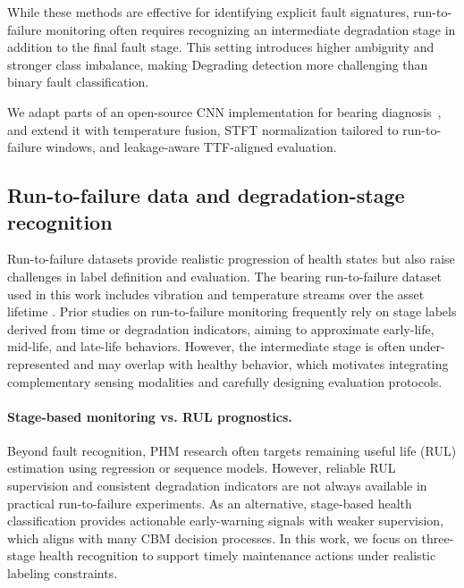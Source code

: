 While these methods are effective for identifying explicit fault signatures, run-to-failure monitoring often requires recognizing an intermediate degradation stage in addition to the final fault stage. This setting introduces higher ambiguity and stronger class imbalance, making Degrading detection more challenging than binary fault classification.

We adapt parts of an open-source CNN implementation for bearing diagnosis~\cite{mdzalfirdausi_paderborn_repo}, and extend it with temperature fusion, STFT normalization tailored to run-to-failure windows, and leakage-aware TTF-aligned evaluation.
\subsection{Run-to-failure data and degradation-stage recognition}
Run-to-failure datasets provide realistic progression of health states but also raise challenges in label definition and evaluation. The bearing run-to-failure dataset used in this work includes vibration and temperature streams over the asset lifetime \cite{jung2024dib_rtf,jung2024mendeley_rtf}. Prior studies on run-to-failure monitoring frequently rely on stage labels derived from time or degradation indicators, aiming to approximate early-life, mid-life, and late-life behaviors. However, the intermediate stage is often under-represented and may overlap with healthy behavior, which motivates integrating complementary sensing modalities and carefully designing evaluation protocols.
\paragraph{Stage-based monitoring vs. RUL prognostics.}
Beyond fault recognition, PHM research often targets remaining useful life (RUL) estimation using regression or sequence models. However, reliable RUL supervision and consistent degradation indicators are not always available in practical run-to-failure experiments. As an alternative, stage-based health classification provides actionable early-warning signals with weaker supervision, which aligns with many CBM decision processes. In this work, we focus on three-stage health recognition to support timely maintenance actions under realistic labeling constraints.
